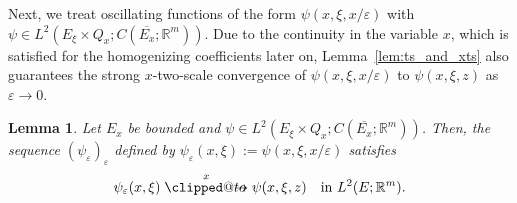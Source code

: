 \documentclass[reqno,11pt]{amsart}
\makeatletter
\numberwithin{equation}{section}
\theoremstyle{thmlemcorr}
\numberwithin{theorem}{section}
\newtheorem{lemma}[theorem]{Lemma}
\theoremstyle{thmlemcorr*}
\theoremstyle{defi}
\theoremstyle{remexample}
\theoremstyle{ass}
\newcommand{\R}{\mathbb{R}}
\renewcommand{\epsilon}{\varepsilon}
\newcommand{\1}{\mathds{1}}
\DeclareRobustCommand{\twoscale}{%
  \clippedto\mathrel{\mspace{-15mu}}\to
}
\newcommand{\clippedto}{%
  \mathrel{\mathpalette\clipped@to\relax}%
}
\newcommand{\clipped@to}[2]{%
  \sbox\z@{$\m@th#1\mspace{6mu}$}%
  \clipbox{0pt 0pt {\dimexpr\width-.5\wd\z@} 0pt}{$\m@th#1\to$}%
  \smash{\clipbox{{\wd\z@} 0pt 0pt {-\width}}{$\m@th#1\to$}}%
}
\newcommand{\xtwoscale}{\overset{x}{\twoscale}}
\newcommand{\veps}{\varepsilon}
\newcommand{\sequence}[2]{(#1_#2)_{#2}}
\makeatother
\begin{document}
Next, we treat oscillating functions of the form \( \psi(x,\xi,x/\veps)\) with \(\psi \in L^2(E_\xi\times Q_x;C(\overline{E_x};\R^m))\). Due to the continuity in the variable $x$, which is satisfied for the homogenizing coefficients later on, 
Lemma~\ref{lem:ts_and_xts} also guarantees the strong \(x\)-two-scale convergence of \( \psi(x,\xi,x/\veps)\) to \( \psi(x,\xi,z)\) as $\veps \to 0$. %
\begin{lemma}\label{le:sxts_nocontinuity}
Let $E_x$ be bounded and $\psi \in L^2(E_\xi\times Q_x;C(\overline{E_x};\R^m))$. Then, the sequence $(\psi_\epsilon)_\epsilon$ defined by $\psi_\epsilon (x,\xi):=\psi(x,\xi,x/\epsilon)$ satisfies
\[
\psi_\epsilon(x,\xi) \xtwoscale \psi(x,\xi,z) \quad \text{in $L^2(E;\R^m)$}.
\]
\end{lemma}
\end{document}
